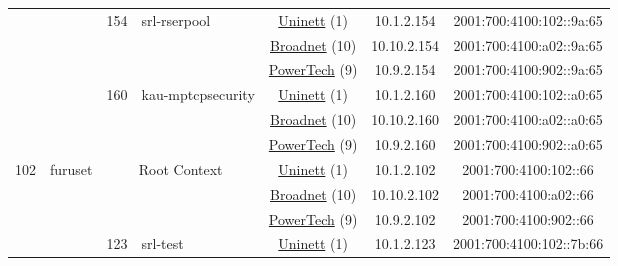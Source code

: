 \begin{small}
\begin{center}
\begin{longtable}{|c|c|c|c|c|c|c|c|}
  &  & \multirow{3}{*}{\tiny{154}} & \multicolumn{1}{|l|}{\multirow{3}{*}{\tiny{srl-rserpool}}} & \multicolumn{2}{|c|}{\tiny{\href{https://www.uninett.no}{Uninett} (1)}} & \tiny{10.1.2.154} & \tiny{2001:700:4100:102::9a:65} \\* \cline{5-5}\cline{6-6}\cline{7-7}\cline{8-8}
  &  &  &  & \multicolumn{2}{|c|}{\tiny{\href{https://www.broadnet.no}{Broadnet} (10)}} & \tiny{10.10.2.154} & \tiny{2001:700:4100:a02::9a:65} \\* \cline{5-5}\cline{6-6}\cline{7-7}\cline{8-8}
  &  &  &  & \multicolumn{2}{|c|}{\tiny{\href{http://www.powertech.no}{PowerTech} (9)}} & \tiny{10.9.2.154} & \tiny{2001:700:4100:902::9a:65} \\* \cline{3-3}\cline{4-4}\cline{5-5}\cline{6-6}\cline{7-7}\cline{8-8}
  &  & \multirow{3}{*}{\tiny{160}} & \multicolumn{1}{|l|}{\multirow{3}{*}{\tiny{kau-mptcpsecurity}}} & \multicolumn{2}{|c|}{\tiny{\href{https://www.uninett.no}{Uninett} (1)}} & \tiny{10.1.2.160} & \tiny{2001:700:4100:102::a0:65} \\* \cline{5-5}\cline{6-6}\cline{7-7}\cline{8-8}
  &  &  &  & \multicolumn{2}{|c|}{\tiny{\href{https://www.broadnet.no}{Broadnet} (10)}} & \tiny{10.10.2.160} & \tiny{2001:700:4100:a02::a0:65} \\* \cline{5-5}\cline{6-6}\cline{7-7}\cline{8-8}
  &  &  &  & \multicolumn{2}{|c|}{\tiny{\href{http://www.powertech.no}{PowerTech} (9)}} & \tiny{10.9.2.160} & \tiny{2001:700:4100:902::a0:65} \\ \hline
 \multirow{24}{*}{\tiny{102}} & \multicolumn{1}{|l|}{\multirow{24}{*}{\tiny{furuset}}} & \multicolumn{2}{|c|}{\multirow{3}{*}{\tiny{Root Context}}} & \multicolumn{2}{|c|}{\tiny{\href{https://www.uninett.no}{Uninett} (1)}} & \tiny{10.1.2.102} & \tiny{2001:700:4100:102::66} \\* \cline{5-5}\cline{6-6}\cline{7-7}\cline{8-8}
  &  & \multicolumn{2}{|c|}{} & \multicolumn{2}{|c|}{\tiny{\href{https://www.broadnet.no}{Broadnet} (10)}} & \tiny{10.10.2.102} & \tiny{2001:700:4100:a02::66} \\* \cline{5-5}\cline{6-6}\cline{7-7}\cline{8-8}
  &  & \multicolumn{2}{|c|}{} & \multicolumn{2}{|c|}{\tiny{\href{http://www.powertech.no}{PowerTech} (9)}} & \tiny{10.9.2.102} & \tiny{2001:700:4100:902::66} \\* \cline{3-3}\cline{4-4}\cline{5-5}\cline{6-6}\cline{7-7}\cline{8-8}
  &  & \multirow{3}{*}{\tiny{123}} & \multicolumn{1}{|l|}{\multirow{3}{*}{\tiny{srl-test}}} & \multicolumn{2}{|c|}{\tiny{\href{https://www.uninett.no}{Uninett} (1)}} & \tiny{10.1.2.123} & \tiny{2001:700:4100:102::7b:66} \\* \cline{5-5}\cline{6-6}\cline{7-7}\cline{8-8}

\end{longtable}
\end{center}
\end{small}
